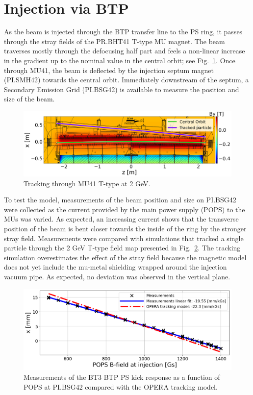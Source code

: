\documentclass[a4paper,
               biblatex,     %
               keeplastbox,   %
               ]{jacow}
\begin{document}
\section{Injection via BTP}
As the beam is injected through the BTP transfer line to the PS ring, it passes through the stray fields of the PR.BHT41 T-type MU magnet. The beam traverses mostly through the defocusing half part and feels a non-linear increase in the gradient up to the nominal value in the central orbit; see Fig.~\ref{fig:injection_btp}. Once through MU41, the beam is deflected by the injection septum magnet (PI.SMH42) towards the central orbit. Immediately downstream of the septum, a Secondary Emission Grid (PI.BSG42) is available to measure the position and size of the beam.

\begin{figure}[!htb]
   \centering
   \includegraphics*[width=1.0\columnwidth]{MOPOTK030_f4.png}
   \caption{Tracking through MU41 T-type at 2 GeV.}
   \label{fig:injection_btp}
\end{figure}

To test the model, measurements of the beam position and size on PI.BSG42 were collected as the current provided by the main power supply (POPS) to the MUs was varied. As expected, an increasing current shows that the transverse position of the beam is bent closer towards the inside of the ring by the stronger stray field. Measurements were compared with simulations that tracked a single particle through the 2 GeV T-type field map presented in Fig.~\ref{fig:injection_btp_transverse_position}. The tracking simulation overestimates the effect of the stray field because the magnetic model does not yet include the mu-metal shielding wrapped around the injection vacuum pipe. As expected, no deviation was observed in the vertical plane.

\begin{figure}[!htb]
   \centering
   \includegraphics*[width=1.0\columnwidth]{MOPOTK030_f5.png}
   \caption{Measurements of the BT3 BTP PS kick response as a function of POPS at PI.BSG42 compared with the OPERA tracking model.}
   \label{fig:injection_btp_transverse_position}
\end{figure}
\end{document}
